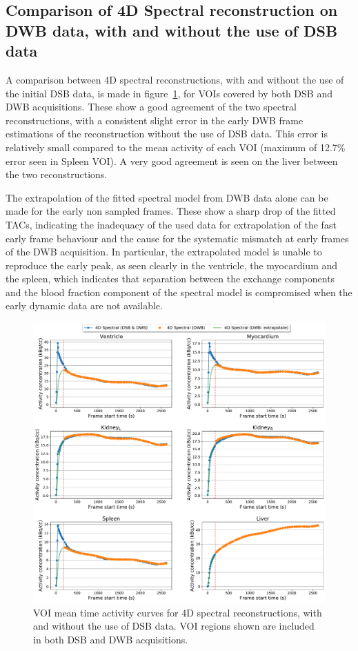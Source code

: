 \subsection{Comparison of 4D Spectral reconstruction on DWB data, with and without the use of DSB data}
A comparison between 4D spectral reconstructions, with and without the use of the initial DSB data, is made in figure~\ref{fig_3_3:IsotoPK_CTRL_DWB_4D_vs_4D_Central}, for VOIs covered by both DSB and DWB acquisitions. These show a good agreement of the two spectral reconstructions, with a consistent slight error in the early DWB frame estimations of the reconstruction without the use of DSB data. This error is relatively small compared to the mean activity of each VOI (maximum of 12.7\% error seen in Spleen VOI). A very good agreement is seen on the liver between the two reconstructions.

The extrapolation of the fitted spectral model from DWB data alone can be made for the early non sampled frames. These show a sharp drop of the fitted TACs, indicating the inadequacy of the used data for extrapolation of the fast early frame behaviour and the cause for the systematic mismatch at early frames of the DWB acquisition.
In particular, the extrapolated model is unable to reproduce the early peak, as seen clearly in the ventricle, the myocardium and the spleen, which indicates that separation between the exchange components and the blood fraction component of the spectral model is compromised when the early dynamic data are not available.

\begin{figure} [h!]
\centering
\includegraphics[scale=0.5,angle=0]{3_Results/3_3_DWB_Reconstruction/figures/3_3_IsotoPK_CTRL_DWB_4D_vs_4D_central.pdf}
\caption{VOI mean time activity curves for 4D spectral reconstructions, with and without the use of DSB data. VOI regions shown are included in both DSB and DWB acquisitions.}
\label{fig_3_3:IsotoPK_CTRL_DWB_4D_vs_4D_Central}
\end{figure} 

